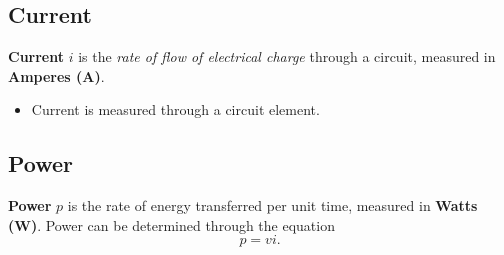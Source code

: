 \documentclass[a4paper]{report}
\begin{document}
\subsection{Current}
\textbf{Current} \(i\) is the \textit{rate of flow of electrical charge} through a circuit, measured in \textbf{Amperes (\unit{A})}.
\begin{itemize}
    \item Current is measured through a circuit element.
\end{itemize}
\subsection{Power}
\textbf{Power} \(p\) is the rate of energy transferred per unit time, measured in \textbf{Watts (\unit{W})}.
Power can be determined through the equation
\begin{equation*}
    p = v i.
\end{equation*}
\end{document}
